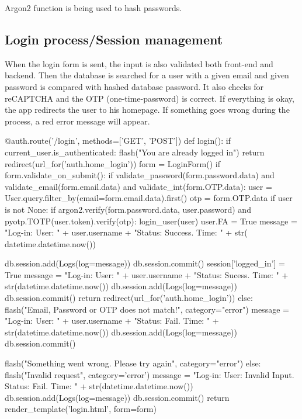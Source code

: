 Argon2 function is being used to hash passwords.

\subsection{Login process/Session management}

When the login form is sent, the input is also validated both front-end and backend. Then the database is searched for a user with a given email and given password is compared with hashed database password. It also checks for reCAPTCHA and the OTP (one-time-password) is correct. If everything is okay, the app redirects the user to his homepage. If something goes wrong during the process, a red error message will appear.

\begin{python}
@auth.route('/login', methods=['GET', 'POST'])
def login():
    if current_user.is_authenticated:
        flash("You are already logged in")
        return redirect(url_for('auth.home_login'))
    form = LoginForm()
    if form.validate_on_submit():
        if validate_password(form.password.data) and validate_email(form.email.data) and validate_int(form.OTP.data):
            user = User.query.filter_by(email=form.email.data).first()
            otp = form.OTP.data
            if user is not None:
                if argon2.verify(form.password.data, user.password) and pyotp.TOTP(user.token).verify(otp):
                    login_user(user)
                    user.FA = True
                    message = "Log-in: User: " + user.username + "Status: Success. Time: " + str(
                        datetime.datetime.now())

                    db.session.add(Logs(log=message))
                    db.session.commit()
                    session['logged_in'] = True
                    message = "Log-in: User: " + user.username + "Status: Sucess. Time: " + str(datetime.datetime.now())
                    db.session.add(Logs(log=message))
                    db.session.commit()
                    return redirect(url_for('auth.home_login'))
                else:
                    flash("Email, Password or OTP does not match!", category="error")
                    message = "Log-in: User: " + user.username + "Status: Fail. Time: " + str(datetime.datetime.now())
                    db.session.add(Logs(log=message))
                    db.session.commit()

            flash("Something went wrong. Please try again", category="error")
        else:
            flash("Invalid request", category='error')
            message = "Log-in: User: Invalid Input. Status: Fail. Time: " + str(datetime.datetime.now())
            db.session.add(Logs(log=message))
            db.session.commit()
    return render_template('login.html', form=form)
\end{python}


